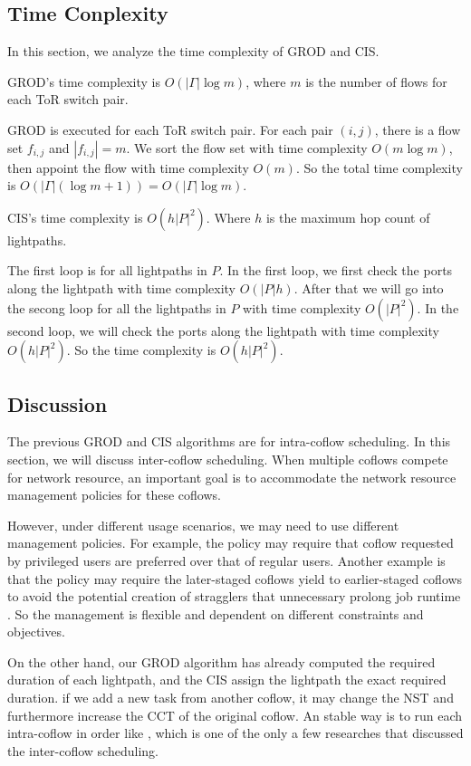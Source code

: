 \subsection{Time Conplexity}
In this section, we analyze the time complexity of GROD and CIS.

\begin{theorem}\label{time:GROD}
GROD's time complexity is $O(|\Gamma|\log m)$, where $m$ is the number of flows for each ToR switch pair.
\end{theorem}
\begin{IEEEproof}
GROD is executed for each ToR switch pair. For each pair $(i,j)$, there is a flow set $f_{i,j}$ and $|f_{i,j}|=m$. We sort the flow set with time complexity $O(m\log m)$, then appoint the flow with time complexity $O(m)$. So the total time complexity is $O(|\Gamma|(\log m+1))=O(|\Gamma|\log m )$.
\end{IEEEproof}
\begin{theorem}\label{time:CIS}
CIS's time complexity is $O(h|P|^2)$. Where $h$ is the maximum hop count of lightpaths.
\end{theorem}
\begin{IEEEproof}
The first loop is for all lightpaths in $P$. In the first loop, we first check the ports along the lightpath with time complexity $O(|P|h)$. After that we will go into the secong loop for all the lightpaths in $P$ with time complexity $O(|P|^2)$. In the second loop, we will check the ports along the lightpath with time complexity $O(h|P|^2)$. So the time complexity is $O(h|P|^2)$.
\end{IEEEproof}
\subsection{Discussion}\label{discussion}
The previous GROD and CIS algorithms are for intra-coflow scheduling. In this section, we will discuss inter-coflow scheduling. When multiple coflows compete for network resource, an important goal is to accommodate the network resource management policies for these coflows.

However, under different usage scenarios, we may need to use different management policies. For example, the policy may require that coflow requested by privileged users are preferred over that of regular users. Another example is that the policy may require the later-staged coflows yield to earlier-staged coflows to avoid the potential creation of stragglers that unnecessary prolong job runtime \cite{chowdhury2015efficient}. So the management is flexible and dependent on different constraints and objectives.

On the other hand, our GROD algorithm has already computed the required duration of each lightpath, and the CIS assign the lightpath the exact required duration. if we add a new task from another coflow, it may change the NST and furthermore increase the CCT of the original coflow. An stable way is to run each intra-coflow in order like \cite{huang2016sunflow}, which is one of the only a few researches that discussed the inter-coflow scheduling.
